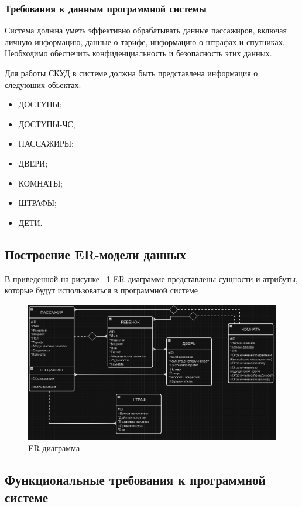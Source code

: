 \subsubsection{Требования к данным программной системы}

Система должна уметь эффективно обрабатывать данные пассажиров, включая личную информацию, данные о тарифе, информацию о штрафах и спутниках. Необходимо обеспечить конфиденциальность и безопасность этих данных.

Для работы СКУД в системе должна быть представлена информация о следуюших обьектах:

\begin{itemize}
	\item ДОСТУПЫ;
	\item ДОСТУПЫ-ЧС;
	\item ПАССАЖИРЫ;
	\item ДВЕРИ;
	\item КОМНАТЫ;
	\item ШТРАФЫ;
	\item ДЕТИ.
\end{itemize}


\subsection{Построение ER-модели данных}

В приведенной на рисунке ~\ref{fig:er} ER-диаграмме представлены сущности и атрибуты, которые будут использоваться в программной системе 

\begin{figure}[ht]
	\centering
	\includegraphics[width=1\linewidth]{images/ER}
	\caption{ER-диаграмма}
	\label{fig:er}
\end{figure}

\subsection{Функциональные требования к программной системе}

